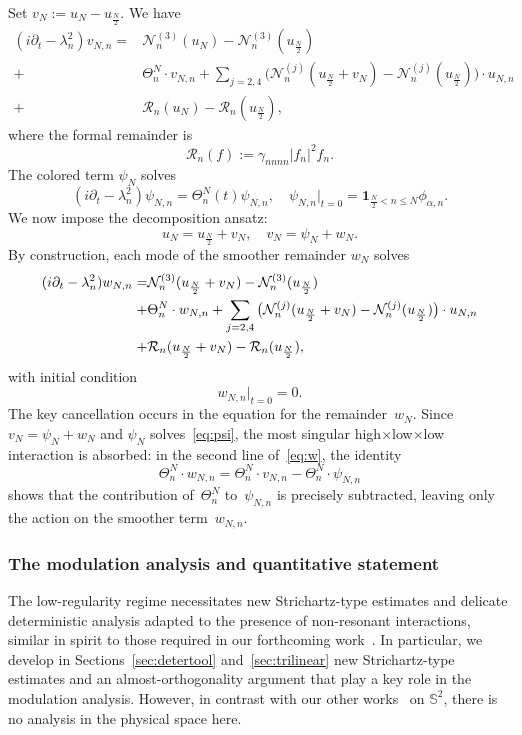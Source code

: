 \documentclass[11pt,reqno,english]{amsart}
\numberwithin{equation}{section}
\theoremstyle{plain}
\theoremstyle{definition}
\theoremstyle{remark}
\begin{document}
Set $v_N:=u_N-u_{\frac{N}{2}}$. We have
\begin{align*}
	(i\partial_t-\lambda_n^2)v_{N,n}=
	&\mathcal{N}_{n}^{(3)}(u_{N})-\mathcal{N}_{n}^{(3)}(u_{\frac{N}{2}})
	\\+&\Theta^N_{n}\cdot v_{N,n}+\sum_{j=2,4}\big(\mathcal{N}_{n}^{(j)}(u_{\frac{N}{2}}+v_{N})-\mathcal{N}_{n}^{(j)}(u_{\frac{N}{2}})\big)\cdot u_{N,n} \\
	+& \mathcal{R}_{n}(u_N)-\mathcal{R}_{n}(u_{\frac{N}{2}}),
\end{align*}
where the formal remainder is
\begin{equation}
	\label{def:R1}
	\mathcal{R}_{n}(f):=\gamma_{nnnn}|f_n|^2 f_n.
\end{equation}
The colored term $\psi_N$ solves
\[
(i\partial_t-\lambda_n^2)\psi_{N,n}=\Theta^N_n(t)\psi_{N,n},\quad \psi_{N,n}|_{t=0}=\mathbf{1}_{\frac{N}{2}<n\leq N}\phi_{\alpha,n}.
\]
We now impose the decomposition ansatz:
\[
u_N = u_{\frac{N}{2}} + v_N,\quad v_N=\psi_N+w_N.
\]
By construction, each mode of the smoother remainder $w_{N}$ solves
\begin{align}
	\label{eq:w}
	(i\partial_{t}-\lambda_{n}^{2})w_{N,n}
	=&\mathcal{N}^{(3)}_{n}(u_{\frac{N}{2}}+v_N)-
	\mathcal{N}_{n}^{(3)}(u_{\frac{N}{2}})\notag \\
	+&\Theta_n^N\cdot w_{N,n} +
	\sum_{j=2,4}\big(
	\mathcal{N}_{n}^{(j)}(u_{\frac{N}{2}}+v_N)-\mathcal{N}_{n}^{(j)}(u_{\frac{N}{2}})
	\big)
	\cdot u_{N,n} \notag \\
	+&\mathcal{R}_{n}(u_{\frac{N}{2}}+v_N)-\mathcal{R}_{n}(u_{\frac{N}{2}}),
\end{align}
with initial condition
\[
w_{N,n}|_{t=0}=0.
\]
The key cancellation occurs in the equation for the remainder~$w_N$. Since $v_N = \psi_N + w_N$ and $\psi_N$ solves~\eqref{eq:psi}, the most singular high$\times$low$\times$low interaction is absorbed: in the second line of~\eqref{eq:w}, the identity
\[
\Theta_{n}^{N}\cdot w_{N,n} = \Theta_{n}^{N}\cdot v_{N,n} - \Theta_{n}^{N}\cdot\psi_{N,n}
\]
shows that the contribution of~$\Theta_n^N$ to~$\psi_{N,n}$ is precisely subtracted, leaving only the action on the smoother term~$w_{N,n}$.

\subsubsection{The modulation analysis and quantitative statement}
The low-regularity regime necessitates new Strichartz-type estimates and delicate deterministic analysis adapted to the presence of non-resonant interactions, similar in spirit to those required in our forthcoming work~\cite{BCST24-2}. In particular, we develop in Sections~\ref{sec:detertool} and~\ref{sec:trilinear} new Strichartz-type estimates and an almost-orthogonality argument that play a key role in the modulation analysis. However, in contrast with our other works~\cite{BCST24,BCST24-2} on $\mathbb{S}^{2}$, there is no analysis in the physical space here.
\end{document}
